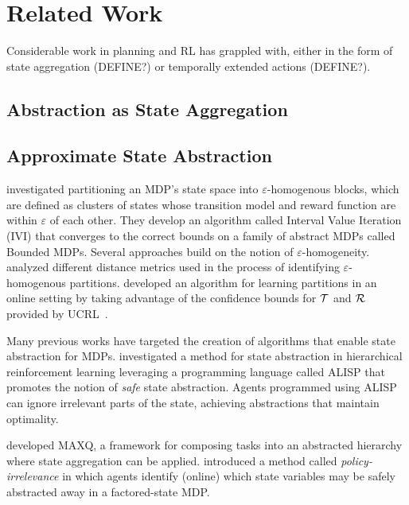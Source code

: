 \section{Related Work}

Considerable work in planning and \ac{RL} has grappled with, either in the form of state aggregation (DEFINE?) or temporally extended actions (DEFINE?).



\subsection{Abstraction as State Aggregation}

\subsection{Approximate State Abstraction}

\citet{dean1997model} investigated partitioning an \ac{MDP}'s state space into $\varepsilon$-homogenous blocks, which are defined as clusters of states whose transition model and reward function are within $\varepsilon$ of each other. They develop an algorithm called Interval Value Iteration (IVI) that converges to the correct bounds on a family of abstract MDPs called Bounded \acp{MDP}. Several approaches build on the notion of $\varepsilon$-homogeneity. \citet{even2003approximate} analyzed different distance metrics used in the process of identifying $\varepsilon$-homogenous partitions. \citet{ortner2013adaptive} developed an algorithm for learning partitions in an online setting by taking advantage of the confidence bounds for $\mathcal{T}$ and $\mathcal{R}$ provided by UCRL~\cite{auer2009near}.


Many previous works have targeted the creation of algorithms that enable state abstraction for MDPs. \citet{andre2002state} investigated a method for state abstraction in hierarchical reinforcement learning leveraging a programming language called ALISP that promotes the notion of {\it safe} state abstraction. Agents programmed using ALISP can ignore irrelevant parts of the state, achieving abstractions that maintain optimality. 

\citet{dietterich2000hierarchical} developed MAXQ, a framework for composing tasks into an abstracted hierarchy where state aggregation can be applied. \citet{jong2005state} introduced a method called {\it policy-irrelevance} in which agents identify (online) which state variables may be safely abstracted away in a factored-state \ac{MDP}. 

